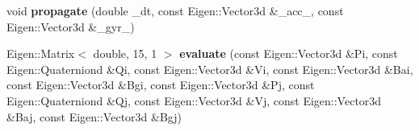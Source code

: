 \begin{DoxyCompactItemize}
\item 
\mbox{\label{classIntegrationBase_a1ece8568e196472e7e415e6ae1be8ee4}} 
void {\bfseries propagate} (double \+\_\+dt, const Eigen\+::\+Vector3d \&\+\_\+acc\+\_, const Eigen\+::\+Vector3d \&\+\_\+gyr\+\_)
\item 
\mbox{\label{classIntegrationBase_a7283223c55fb934e702b012618c6c6ea}} 
Eigen\+::\+Matrix$<$ double, 15, 1 $>$ {\bfseries evaluate} (const Eigen\+::\+Vector3d \&Pi, const Eigen\+::\+Quaterniond \&Qi, const Eigen\+::\+Vector3d \&Vi, const Eigen\+::\+Vector3d \&Bai, const Eigen\+::\+Vector3d \&Bgi, const Eigen\+::\+Vector3d \&Pj, const Eigen\+::\+Quaterniond \&Qj, const Eigen\+::\+Vector3d \&Vj, const Eigen\+::\+Vector3d \&Baj, const Eigen\+::\+Vector3d \&Bgj)
\end{DoxyCompactItemize}
